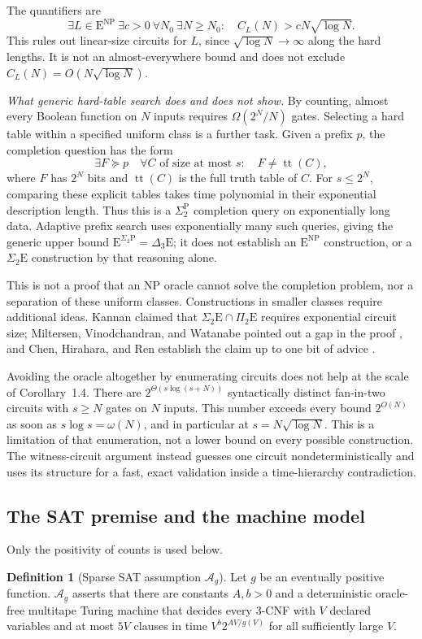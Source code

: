 \documentclass[11pt,reqno]{amsart}
\numberwithin{equation}{section}
\theoremstyle{plain}
\theoremstyle{definition}
\newtheorem{definition}[theorem]{Definition}
\theoremstyle{remark}
\newcommand{\ENP}{\mathrm E^{\mathrm{NP}}}
\newcommand{\parhead}[1]{\par\smallskip\noindent\textit{#1}\enspace\ignorespaces}
\begin{document}
The quantifiers are
\begin{equation}\label{eq:io}
 \exists L\in\ENP\ \exists c>0\ \forall N_0\ \exists N\ge N_0:\quad
 C_L(N)>cN\sqrt{\log N}.
\end{equation}
This rules out linear-size circuits for $L$, since $\sqrt{\log N}\to\infty$
along the hard lengths. It is not an almost-everywhere bound and does not
exclude $C_L(N)=O(N\sqrt{\log N})$.

\parhead{What generic hard-table search does and does not show.}
By counting, almost every Boolean function on $N$ inputs requires
$\Omega(2^N/N)$ gates. Selecting a hard table within a specified uniform
class is a further task. Given a prefix $p$, the completion question has
the form
\[
 \exists F\succeq p\quad\forall C\text{ of size at most }s:
                         \quad F\ne\operatorname{tt}(C),
\]
where $F$ has $2^N$ bits and $\operatorname{tt}(C)$ is the full truth table
of $C$. For $s\le2^N$, comparing these explicit tables takes time
polynomial in their exponential description length. Thus this is a
$\Sigma_2^{\mathrm P}$ completion query on exponentially long data.
Adaptive prefix search uses exponentially many such queries, giving the
generic upper bound $\mathrm E^{\Sigma_2\mathrm P}=\Delta_3\mathrm E$;
it does not establish an $\ENP$ construction, or a
$\Sigma_2\mathrm E$ construction by that reasoning alone.

This is not a proof that an NP oracle cannot solve the completion problem,
nor a separation of these uniform classes. Constructions in smaller classes
require additional ideas. Kannan claimed that
$\Sigma_2\mathrm E\cap\Pi_2\mathrm E$ requires exponential circuit size;
Miltersen, Vinodchandran, and Watanabe pointed out a gap in the proof
\cite{MVW}, and Chen, Hirahara, and Ren establish the claim up to one bit
of advice \cite[Section~1]{CHR}.

Avoiding the oracle altogether by enumerating circuits does not help at
the scale of Corollary~1.4. There are $2^{\Theta(s\log(s+N))}$ syntactically
distinct fan-in-two circuits with $s\ge N$ gates on $N$ inputs. This number
exceeds every bound $2^{O(N)}$ as soon as $s\log s=\omega(N)$, and in
particular at $s=N\sqrt{\log N}$. This is a limitation of that enumeration,
not a lower bound on every possible construction. The witness-circuit argument
instead guesses one circuit nondeterministically and uses its structure
for a fast, exact validation inside a time-hierarchy contradiction.

\subsection{The SAT premise and the machine model}
Only the positivity of counts is used below.
\begin{definition}[Sparse SAT assumption $\mathcal A_g$]\label{def:assumption}
Let $g$ be an eventually positive function. $\mathcal A_g$ asserts that there
are constants $A,b>0$ and a deterministic oracle-free multitape Turing machine
that decides every 3-CNF with $V$ declared variables and at most $5V$
clauses in time $V^b2^{AV/g(V)}$ for all sufficiently large $V$.
\end{definition}
\end{document}
